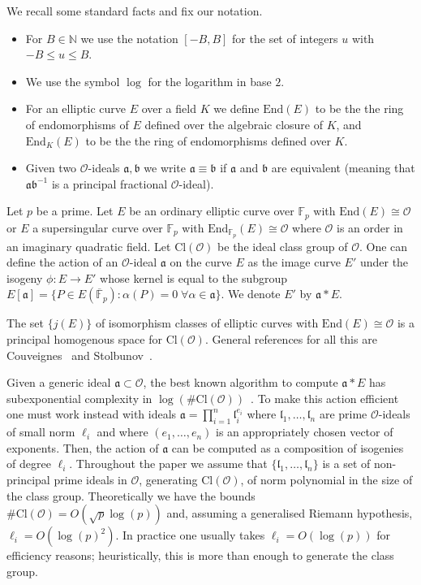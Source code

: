 \documentclass{llncs}
\newcommand{\F}{\mathbb{F}}
\newcommand{\Fpbar}{\overline{\mathbb{F}}_p}
\newcommand{\N}{\mathbb{N}}
\newcommand{\OO}{\mathcal{O}}
\newcommand{\End}{\text{End}}
\newcommand{\Cl}{\text{Cl}}
\renewcommand{\a}{\mathfrak{a}}
\renewcommand{\b}{\mathfrak{b}}
\renewcommand{\l}{\mathfrak{l}}
\begin{document}
We recall some standard facts and fix our notation.

\begin{itemize}
\item For $B \in \N$ we use the notation $[-B,B]$ for the set of integers $u$ with $-B \le u \le B$.
\item We use the symbol $\log$ for the logarithm in base $2$.

\item For an elliptic curve $E$ over a field $K$ we define $\End(E)$ to be the the ring of endomorphisms of $E$ defined over the algebraic closure of $K$, and $\End_K(E)$ to be the the ring of endomorphisms defined over $K$.
\item Given two $\OO$-ideals $\a, \b$ we write $\a \equiv \b$ if $\a$ and $\b$ are equivalent (meaning that $\a \b^{-1}$ is a principal fractional $\OO$-ideal). 
\end{itemize}


Let $p$ be a prime.
Let $E$ be an ordinary elliptic curve over $\F_p$ with $\End(E) \cong \OO$ or $E$ a supersingular curve over $\F_p$ with $\End_{\F_p}(E) \cong \OO$ where $\OO$ is an order in an imaginary quadratic field.
Let $\Cl(\OO )$ be the ideal class group of $\OO$.
One can define the action of an $\OO$-ideal $\a$ on the curve $E$ as the image curve $E'$ under the isogeny $\phi : E \to E'$ whose kernel is equal to the subgroup $E[ \a ] = \{ P \in E( \Fpbar ) : \alpha(P) = 0 \; \forall \alpha \in \a \}$.
We denote $E'$ by $\a * E$.

The set $\{ j(E) \}$ of isomorphism classes of elliptic curves with $\End(E) \cong \OO$ is a principal homogenous space for $\Cl(\OO )$.
General references for all this are Couveignes~\cite{Couv06}
and Stolbunov~\cite{Sto12}.

Given a generic ideal $\a\subset\OO$, the best known algorithm to compute $\a*E$ has subexponential complexity in $\log(\#\Cl(\OO))$~\cite{JS10}.
To make this action efficient one must work instead with ideals $\a = \prod_{i=1}^n \l_i^{e_i}$ where $\l_1, \dots, \l_n$ are prime $\OO$-ideals of small norm $\ell_i$ and where $(e_1, \dots, e_n)$ is an appropriately chosen vector of exponents.
Then, the action of $\a$ can be computed as a composition of isogenies of degree $\ell_i$.
Throughout the paper we assume that $\{ \l_1, \dots, \l_n \}$ is a set of non-principal prime ideals in $\OO$, generating $\Cl(\OO)$, of norm polynomial in the size of the class group.
Theoretically we have the bounds $\#\Cl(\OO) = O( \sqrt{p} \log(p) )$ and, assuming a generalised Riemann hypothesis, $\ell_i = O( \log(p)^2 )$.
In practice one usually takes $\ell_i=O(\log(p))$ for efficiency reasons; heuristically, this is more than enough to generate the class group.
\end{document}
